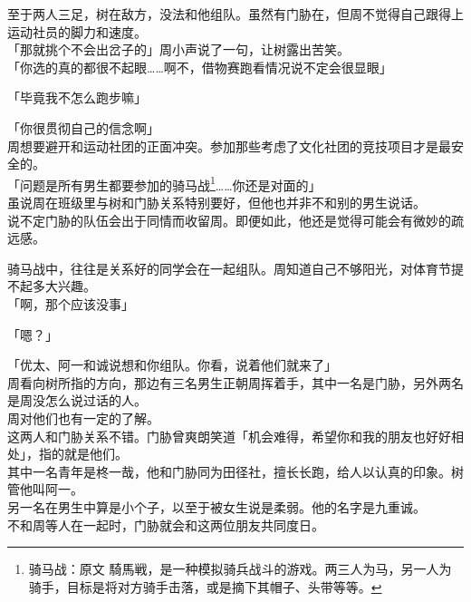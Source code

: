 至于两人三足，树在敌方，没法和他组队。虽然有门胁在，但周不觉得自己跟得上运动社员的脚力和速度。\\

「那就挑个不会出岔子的」周小声说了一句，让树露出苦笑。\\

「你选的真的都很不起眼……啊不，借物赛跑看情况说不定会很显眼」

「毕竟我不怎么跑步嘛」

「你很贯彻自己的信念啊」\\

周想要避开和运动社团的正面冲突。参加那些考虑了文化社团的竞技项目才是最安全的。\\

「问题是所有男生都要参加的骑马战\footnote{骑马战：原文 {\jpfont 騎馬戦}，是一种模拟骑兵战斗的游戏。两三人为马，另一人为骑手，目标是将对方骑手击落，或是摘下其帽子、头带等等。}……你还是对面的」\\

虽说周在班级里与树和门胁关系特别要好，但他也并非不和别的男生说话。\\

说不定门胁的队伍会出于同情而收留周。即便如此，他还是觉得可能会有微妙的疏远感。

骑马战中，往往是关系好的同学会在一起组队。周知道自己不够阳光，对体育节提不起多大兴趣。\\

「啊，那个应该没事」

「嗯？」

「优太、阿一和诚说想和你组队。你看，说着他们就来了」\\

周看向树所指的方向，那边有三名男生正朝周挥着手，其中一名是门胁，另外两名是周没怎么说过话的人。\\

周对他们也有一定的了解。\\

这两人和门胁关系不错。门胁曾爽朗笑道「机会难得，希望你和我的朋友也好好相处」，指的就是他们。\\

其中一名青年是柊一哉，他和门胁同为田径社，擅长长跑，给人以认真的印象。树管他叫阿一。\\

另一名在男生中算是小个子，以至于被女生说是柔弱。他的名字是九重诚。\\

不和周等人在一起时，门胁就会和这两位朋友共同度日。\\

